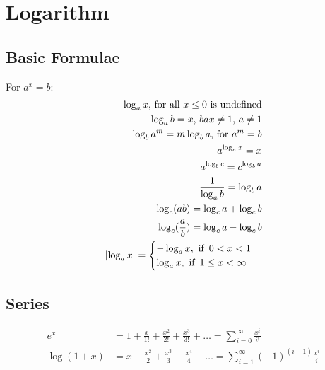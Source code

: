 \chapter{Logarithm}
\section{Basic Formulae}
For $a^x=b$:
\begin{align}
	\log_a x \text{, for all }x\leq0\text{ is undefined}\\
	\log_a b=x\text{, }bax\neq1\text{, }a\neq1\\
	\log_b a^m=m\log_b a\text{, for } a^m=b\\
	a^{\log_a x}=x\\
	a^{\log_b c}=c^{\log_b a}\\
	\frac{1}{\log_a b}=\log_b a\\
	\log_c (ab)=\log_c a+\log_c b\\
	\log_c (\frac{a}{b})=\log_c a-\log_c b\\
	\lvert\log_a x\rvert =
	\begin{cases}
		-\log_a x, \text{ if } \, 0 < x < 1\\
		\log_a x, \text{ if } \, 1\leq x < \infty \\
	\end{cases}
\end{align}


\section{Series}
\begin{align}
	e^x
		&= 1 + \frac{x}{1!} + \frac{x^2}{2!} + \frac{x^3}{3!} + \ldots
		= \sum_{i=0}^{\infty} \frac{x^i}{i!}\\
	\log(1+x)
		&= x - \frac{x^2}{2} + \frac{x^3}{3} - \frac{x^4}{4} + \ldots
		= \sum_{i=1}^{\infty} (-1)^{(i-1)} \frac{x^i}{i}
\end{align}
